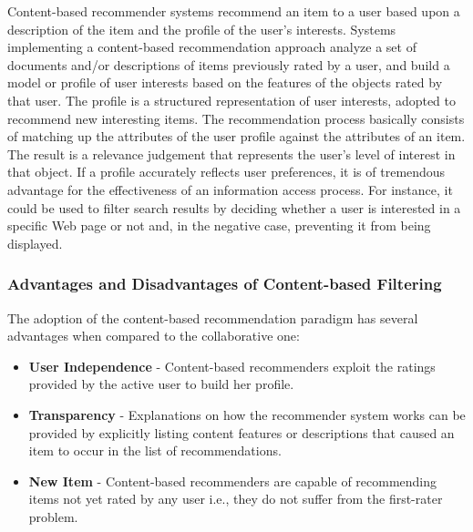  Content-based recommender systems recommend an item to a user based upon a description of the item and the profile of the user's interests. Systems implementing a content-based recommendation approach analyze a set of documents and/or descriptions of items previously rated by a user, and build a model or profile of user interests based on the features of the objects rated by that user. The profile is a structured representation of user interests, adopted to recommend new interesting items. The recommendation process basically consists of matching up the attributes of the user profile against the attributes of an item. The result is a relevance judgement that represents the user’s level of interest in that object. If a profile accurately reflects user preferences, it is of tremendous advantage for the effectiveness of an information access process. For instance, it could be used to filter search results by deciding whether a user is interested in a specific Web page or not and, in the negative case, preventing it from being displayed.
\subsubsection{Advantages and Disadvantages of Content-based Filtering}

 The adoption of the content-based recommendation paradigm has several advantages when compared to the collaborative one:
\begin{itemize}
\item \textbf{User Independence} - Content-based recommenders exploit the ratings provided by the active user to build her profile.
\end{itemize}
\begin{itemize}
\item \textbf{Transparency} - Explanations on how the recommender system works can be provided by explicitly listing content features or descriptions that caused an item to occur in the list of recommendations. 
\end{itemize}
\begin{itemize}
\item \textbf{New Item} - Content-based recommenders are capable of recommending items not yet rated by any user i.e., they do not suffer from the first-rater problem.
\end{itemize}

